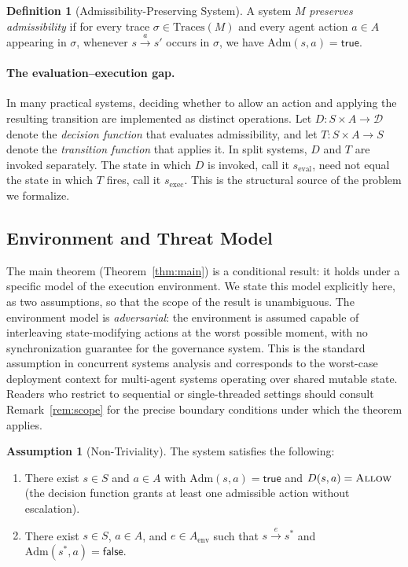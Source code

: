 \documentclass[11pt]{article}
\theoremstyle{plain}
\theoremstyle{definition}
\newtheorem{definition}[theorem]{Definition}
\newtheorem{assumption}[theorem]{Assumption}
\theoremstyle{remark}
\newcommand{\Allow}{\textsc{Allow}}
\newcommand{\Dset}{\mathcal{D}}
\newcommand{\Adm}{\mathrm{Adm}}
\newcommand{\Traces}{\mathrm{Traces}}
\newcommand{\eval}{\mathrm{eval}}
\newcommand{\exec}{\mathrm{exec}}
\begin{document}
\begin{definition}[Admissibility-Preserving System]
\label{def:admpres}
A system $M$ \emph{preserves admissibility} if for every trace
$\sigma \in \Traces(M)$ and every agent action $a \in A$ appearing in $\sigma$,
whenever $s \xrightarrow{a} s'$ occurs in $\sigma$, we have $\Adm(s, a) = \mathsf{true}$.
\end{definition}

\paragraph{The evaluation--execution gap.}
In many practical systems, deciding whether to allow an action and applying
the resulting transition are implemented as distinct operations.  Let $D : S
\times A \to \Dset$ denote the \emph{decision function} that evaluates
admissibility, and let $T : S \times A \to S$ denote the \emph{transition
function} that applies it.  In split systems, $D$ and $T$ are invoked
separately.  The state in which $D$ is invoked, call it $s_{\eval}$, need not
equal the state in which $T$ fires, call it $s_{\exec}$.  This is the
structural source of the problem we formalize.

\subsection{Environment and Threat Model}
\label{sec:envmodel}

The main theorem (Theorem~\ref{thm:main}) is a conditional result: it holds
under a specific model of the execution environment.  We state this model
explicitly here, as two assumptions, so that the scope of the result is
unambiguous.  The environment model is \emph{adversarial}: the environment is
assumed capable of interleaving state-modifying actions at the worst possible
moment, with no synchronization guarantee for the governance system.  This is
the standard assumption in concurrent systems analysis and corresponds to the
worst-case deployment context for multi-agent systems operating over shared
mutable state.  Readers who restrict to sequential or single-threaded settings
should consult Remark~\ref{rem:scope} for the precise boundary conditions under
which the theorem applies.

\begin{assumption}[Non-Triviality]
\label{asm:nontrivial}
The system satisfies the following:
\begin{enumerate}[label=(\roman*)]
  \item There exist $s \in S$ and $a \in A$ with $\Adm(s, a) = \mathsf{true}$
    and $D(s, a) = \Allow$ (the decision function grants at least one
    admissible action without escalation).
  \item There exist $s \in S$, $a \in A$, and $e \in A_{\mathrm{env}}$ such that
    $s \xrightarrow{e} s^*$ and $\Adm(s^*, a) = \mathsf{false}$.
\end{enumerate}
\end{assumption}
\end{document}
